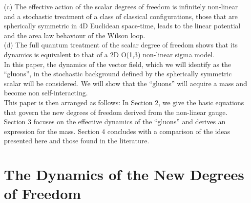 \documentclass[a4paper,12pt]{article}
\begin{document}
(c) The effective action of the scalar degrees of freedom is infinitely non-linear and a stochastic treatment of a class of classical configurations, those that are spherically symmetric in 4D Euclidean space-time, leads to the linear potential and the area law behaviour of the Wilson loop\cite{mass}.\\

(d) The full quantum treatment of the scalar degree of freedom shows that its dynamics is equivalent to that of a 2D O(1,3) non-linear sigma model\cite{free}.\\

In this paper, the dynamics of the vector field, which we will identify as the ``gluons'', in the stochastic background defined by the spherically symmetric scalar will be considered.  We will show that the ``gluons'' will acquire a mass and become non self-interacting.\\

This paper is then arranged as follows:  In Section 2, we give the basic equations that govern the new degrees of freedom derived from the non-linear gauge.  Section 3 focuses on the effective dynamics of the ``gluons'' and derives an expression for the mass.  Section 4 concludes with a comparison of the ideas presented here and those found in the literature.

\section{The Dynamics of the New Degrees of Freedom}
\end{document}
